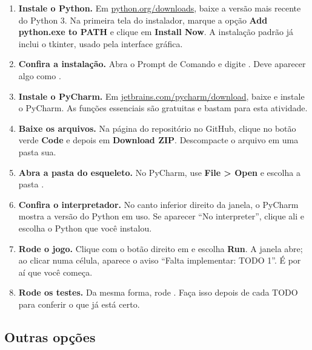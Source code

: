\documentclass[11pt]{article}
\begin{document}
\begin{enumerate}
  \item \textbf{Instale o Python.} Em \href{https://www.python.org/downloads/}{python.org/downloads},
        baixe a versão mais recente do Python 3. Na primeira tela do instalador, marque a opção
        \textbf{Add python.exe to PATH} e clique em \textbf{Install Now}. A instalação padrão já
        inclui o tkinter, usado pela interface gráfica.
  \item \textbf{Confira a instalação.} Abra o Prompt de Comando e digite .
        Deve aparecer algo como .
  \item \textbf{Instale o PyCharm.} Em \href{https://www.jetbrains.com/pycharm/download/}{jetbrains.com/pycharm/download},
        baixe e instale o PyCharm. As funções essenciais são gratuitas e bastam para esta atividade.
  \item \textbf{Baixe os arquivos.} Na página do repositório no GitHub, clique no botão verde
        \textbf{Code} e depois em \textbf{Download ZIP}. Descompacte o arquivo em uma pasta sua.
  \item \textbf{Abra a pasta do esqueleto.} No PyCharm, use \textbf{File > Open} e escolha a pasta
        .
  \item \textbf{Confira o interpretador.} No canto inferior direito da janela, o PyCharm mostra a
        versão do Python em uso. Se aparecer \enquote{No interpreter}, clique ali e escolha o Python
        que você instalou.
  \item \textbf{Rode o jogo.} Clique com o botão direito em  e escolha
        \textbf{Run}. A janela abre; ao clicar numa célula, aparece o aviso
        \enquote{Falta implementar: TODO 1}. É por aí que você começa.
  \item \textbf{Rode os testes.} Da mesma forma, rode . Faça isso depois de
        cada TODO para conferir o que já está certo.
\end{enumerate}

\subsection{Outras opções}
\end{document}
